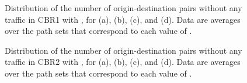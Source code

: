 \documentclass{article}
\begin{document}
\begin{figure}[t]
\centering
{}
\caption[Origin-destination pairs without any traffic in CBR1]{Distribution of
the number of origin-destination pairs without any traffic in CBR1 with ,
for  (a),  (b),  (c), and  (d). Data
are averages over the  path sets that correspond to each value of
.}
\label{figureS8}
\end{figure}

\begin{figure}[t]
\centering
{}
\caption[Origin-destination pairs without any traffic in CBR2]{Distribution of
the number of origin-destination pairs without any traffic in CBR2 with ,
for  (a),  (b),  (c), and  (d). Data
are averages over the  path sets that correspond to each value of
.}
\label{figureS9}
\end{figure}

 
\end{document}
